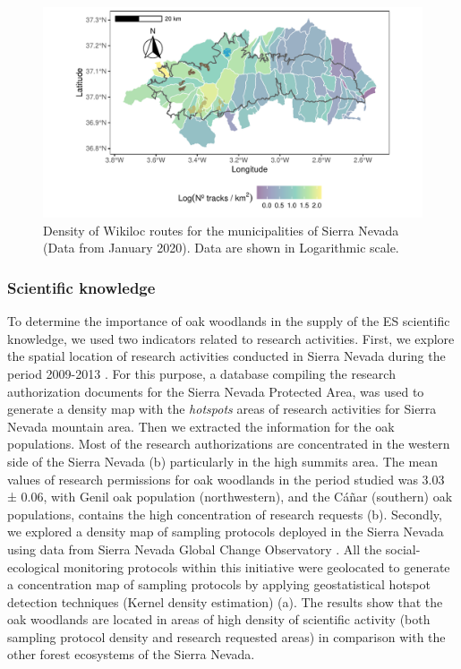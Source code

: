 \begin{figure}
    \centering
    \includegraphics[width=\textwidth]{img/es/es-wikiloc.pdf}\caption{Density of Wikiloc routes for the municipalities of Sierra Nevada (Data from January 2020). Data are shown in Logarithmic scale.}\label{fig:es:wikiloc}
\end{figure}

\subsubsection{Scientific knowledge}\label{sec:es:cultural-scientific} 
To determine the importance of oak woodlands in the supply of the ES scientific knowledge, we used two indicators related to research activities. First, we explore the spatial location of research activities conducted in Sierra Nevada during the period 2009-2013 \autocites{Zamoraetal2017MonitoringGlobal}. For this purpose, a database compiling the research authorization documents for the Sierra Nevada Protected Area, was used to generate a density map with the \emph{hotspots} areas of research activities for Sierra Nevada mountain area. Then we extracted the information for the oak populations. Most of the research authorizations are concentrated in the western side of the Sierra Nevada (b) particularly in the high summits area. The mean values of research permissions for oak woodlands in the period studied was 3.03 ± 0.06, with Genil oak population (northwestern), and the Cáñar (southern) oak populations, contains the high concentration of research requests (b). 
Secondly, we explored a density map of sampling protocols deployed in the Sierra Nevada \autocites{Zamoraetal2017MonitoringGlobal} using data from Sierra Nevada Global Change Observatory \autocites{Zamoraetal2016GlobalChange}. All the social-ecological monitoring protocols within this initiative were geolocated to generate a concentration map of sampling protocols by applying geostatistical hotspot detection techniques (Kernel density estimation) \autocites{Zamoraetal2016GlobalChange} (a). The results show that the oak woodlands are located in areas of high density of scientific activity (both sampling protocol density and research requested areas) in comparison with the other forest ecosystems of the Sierra Nevada.

